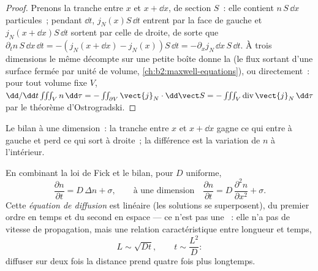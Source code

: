 \begin{proof}
Prenons la tranche entre $x$ et $x + \dd x$, de section $S$~: elle contient
$n\,S\,\dd x$ particules~; pendant $\dd t$, $j_N(x)S\,\dd t$ entrent par la
face de gauche et $j_N(x + \dd x)S\,\dd t$ sortent par celle de droite, de sorte que
$\partial_t n\,S\,\dd x\,\dd t = -(j_N(x+\dd x) - j_N(x))S\,\dd t =
-\partial_x j_N\,\dd x\,S\,\dd t$. À trois dimensions le même décompte sur
une petite boîte donne la  (le flux sortant d'une surface fermée par
unité de volume, \cref{ch:b2:maxwell-equations}), ou directement~: pour tout
volume fixe $V$, $\dd/\dd t \iiint_V n\,\dd\tau = -\iint_{\partial V}
\vect{j}_N\cdot\dd\vect S = -\iiint_V \operatorname{div}\vect{j}_N\,\dd\tau$
par le théorème d'Ostrogradski.
\end{proof}

\begin{omfigure}

{\small Le bilan à une dimension~: la tranche entre $x$ et $x + \dd
x$ gagne ce qui entre à gauche et perd ce qui sort à droite~;
la différence est la variation de $n$ à l'intérieur.}
\end{omfigure}

\begin{theorem}\label{thm:b2:particle-diffusion:equation}
En combinant la loi de Fick et le bilan, pour $D$ uniforme,
\[
\frac{\partial n}{\partial t} = D\,\Delta n + \sigma ,
\qquad\text{à une dimension}\quad
\frac{\partial n}{\partial t} = D\,\frac{\partial^2 n}{\partial x^2} + \sigma .
\]
Cette \emph{équation de diffusion} est linéaire
(les solutions se superposent), du premier ordre en temps et du second en espace
--- ce n'est pas une ~: elle n'a pas de vitesse de propagation, mais une
relation caractéristique entre longueur et temps,
\[
L \sim \sqrt{D t}, \qquad t \sim \frac{L^2}{D} :
\]
diffuser sur deux fois la distance prend quatre fois plus longtemps.
\end{theorem}

